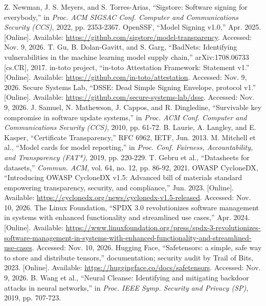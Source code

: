  Z. Newman, J. S. Meyers, and S. Torres-Arias, ``Sigstore: Software signing for everybody,'' in \emph{Proc. ACM SIGSAC Conf. Computer and Communications Security (CCS)}, 2022, pp. 2353-2367.
 OpenSSF, ``Model Signing v1.0,'' Apr. 2025. [Online]. Available: \url{https://github.com/sigstore/model-transparency}. Accessed: Nov. 9, 2026.
 T. Gu, B. Dolan-Gavitt, and S. Garg, ``BadNets: Identifying vulnerabilities in the machine learning model supply chain,'' arXiv:1708.06733 [cs.CR], 2017.
 in-toto project, ``in-toto Attestation Framework: Statement v1.'' [Online]. Available: \url{https://github.com/in-toto/attestation}. Accessed: Nov. 9, 2026.
 Secure Systems Lab, ``DSSE: Dead Simple Signing Envelope, protocol v1.'' [Online]. Available: \url{https://github.com/secure-systems-lab/dsse}. Accessed: Nov. 9, 2026.
 J. Samuel, N. Mathewson, J. Cappos, and R. Dingledine, ``Survivable key compromise in software update systems,'' in \emph{Proc. ACM Conf. Computer and Communications Security (CCS)}, 2010, pp. 61-72.
 B. Laurie, A. Langley, and E. Kasper, ``Certificate Transparency,'' RFC 6962, IETF, Jun. 2013.
 M. Mitchell et al., ``Model cards for model reporting,'' in \emph{Proc. Conf. Fairness, Accountability, and Transparency (FAT*)}, 2019, pp. 220-229.
 T. Gebru et al., ``Datasheets for datasets,'' \emph{Commun. ACM}, vol. 64, no. 12, pp. 86-92, 2021.
 OWASP CycloneDX, ``Introducing OWASP CycloneDX v1.5: Advanced bill of materials standard empowering transparency, security, and compliance,'' Jun. 2023. [Online]. Available: \url{https://cyclonedx.org/news/cyclonedx-v1.5-released}. Accessed: Nov. 10, 2026.
 The Linux Foundation, ``SPDX 3.0 revolutionizes software management in systems with enhanced functionality and streamlined use cases,'' Apr. 2024. [Online]. Available: \url{https://www.linuxfoundation.org/press/spdx-3-revolutionizes-software-management-in-systems-with-enhanced-functionality-and-streamlined-use-cases}. Accessed: Nov. 10, 2026.
 Hugging Face, ``Safetensors: a simple, safe way to store and distribute tensors,'' documentation; security audit by Trail of Bits, 2023. [Online]. Available: \url{https://huggingface.co/docs/safetensors}. Accessed: Nov. 9, 2026.
 B. Wang et al., ``Neural Cleanse: Identifying and mitigating backdoor attacks in neural networks,'' in \emph{Proc. IEEE Symp. Security and Privacy (SP)}, 2019, pp. 707-723.
